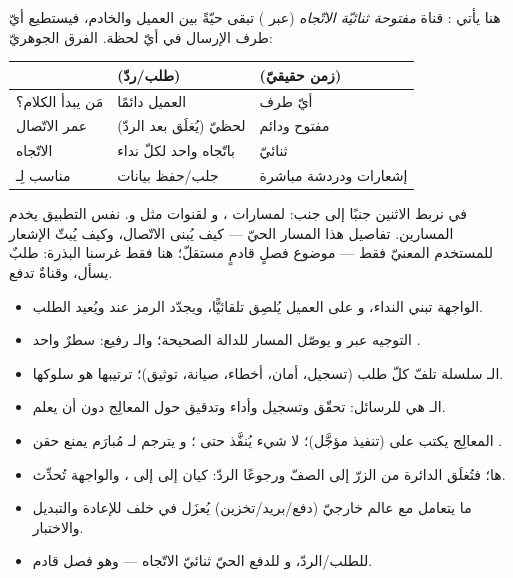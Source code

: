 هنا يأتي : قناة \emph{مفتوحة ثنائيّة الاتّجاه} (عبر ) تبقى
حيّةً بين العميل والخادم، فيستطيع أيّ طرف الإرسال في أيّ لحظة. الفرق الجوهريّ:

\begin{center}
\begin{tabular}{L{4.0cm} L{4.3cm} L{4.3cm}}
\toprule
 & \textbf{\color{spPrimary} (طلب/ردّ)} & \textbf{\color{spPrimary} (زمن حقيقيّ)} \\
\midrule
مَن يبدأ الكلام؟ & العميل دائمًا & أيّ طرف \\
عمر الاتّصال & لحظيّ (يُغلَق بعد الردّ) & مفتوح ودائم \\
الاتّجاه & باتّجاه واحد لكلّ نداء & ثنائيّ \\
مناسب لِـ & جلب/حفظ بيانات & إشعارات ودردشة مباشرة \\
\bottomrule
\end{tabular}
\end{center}

في  نربط الاثنين جنبًا إلى جنب:  لمسارات
، و لقنوات  مثل 
و. نفس التطبيق يخدم المسارين. تفاصيل هذا المسار الحيّ — كيف يُبنى
الاتّصال، وكيف يُبثّ الإشعار للمستخدم المعنيّ فقط — موضوع فصلٍ قادمٍ مستقلّ؛ هنا فقط
غرسنا البذرة: طلبٌ يسأل، وقناةٌ تدفع.

\begin{summary}
\begin{itemize}
\item الواجهة  تبني النداء، و على العميل
  يُلصِق  تلقائيًّا، ويجدّد الرمز عند  ويُعيد الطلب.
\item التوجيه  عبر \code{[ApiController]} و\code{[HttpGet]} يوصّل المسار
  للدالة الصحيحة؛ والـ  رفيع: سطرٌ واحد .
\item الـ  سلسلة تلفّ كلّ طلب (تسجيل، أمان، أخطاء، صيانة، توثيق)؛
  ترتيبها هو سلوكها.
\item الـ  هي  للرسائل: تحقّق وتسجيل
  وأداء وتدقيق حول المعالِج دون أن يعلم.
\item المعالِج يكتب  على  (تنفيذ مؤجَّل)؛ لا شيء يُنفَّذ حتى
  ؛ و يترجم لـ  مُبارَم يمنع حقن .
\item الردّ: كيان إلى  إلى ، والواجهة تُحدِّث ‎ها؛ فتُغلَق
  الدائرة من الزرّ إلى الصفّ ورجوعًا.
\item ما يتعامل مع عالم خارجيّ (دفع/بريد/تخزين) يُعزَل في  خلف 
  للإعادة والتبديل والاختبار.
\item {} للطلب/الردّ، و للدفع الحيّ ثنائيّ الاتّجاه — وهو فصل قادم.
\end{itemize}
\end{summary}
